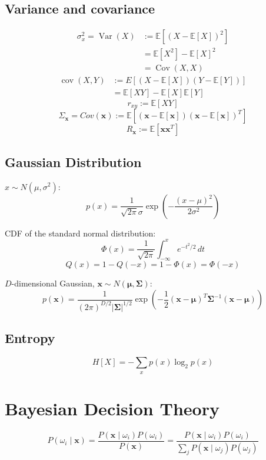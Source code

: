 \documentclass{article}
\begin{document}
\begin{multicols}{2}
\subsection{Variance and covariance}
\[\begin{split}
	\sigma_x^2 = \operatorname{Var}(X) &:= \mathbb{E}[(X - \mathbb{E}[X])^2] \\
	&= \mathbb{E}[X^2] - \mathbb{E}[X]^2 \\
	&= \operatorname{Cov}(X, X)
\end{split}\]
\[\begin{split}
	\operatorname{cov}(X, Y) &:= E{\left[(X - \mathbb{E}[X])(Y - \mathbb{E}[Y])\right]} \\
	&= \mathbb{E}[X Y] - \mathbb{E}[X] \mathbb{E}[Y]
\end{split}\]
\[r_{xy} := \mathbb{E}[X Y]\]
\[\Sigma_{\symbf{x}} = Cov(\symbf{x}) := \mathbb{E}\left[(\symbf{x} - \mathbb{E}[\symbf{x}])(\symbf{x} - \mathbb{E}[\symbf{x}])^T\right]\]
\[R_{\symbf{x}} := \mathbb{E}[\symbf{x} \symbf{x}^T]\]

\subsection{Gaussian Distribution}
$x \sim N(\mu, \sigma^2)$:
\[p(x) = \frac{1}{\sqrt{2 \pi} \sigma} \exp\left(-\frac{(x-\mu)^2}{2\sigma^2}\right)\]

CDF of the standard normal distribution:
\[\Phi(x) = \frac{1}{\sqrt{2\pi}} \int_{-\infty}^x e^{-t^2/2} \, dt\]
\[Q(x) = 1 - Q(-x) = 1 - \Phi(x) = \Phi(-x)\]

$D$-dimensional Gaussian, $\symbf{x} \sim N(\symbf{\mu}, \symbf{\Sigma})$:
\[p(\symbf{x}) = \frac{1}{(2 \pi)^{D/2} |\symbf{\Sigma}|^{1/2}} \exp\left(-\frac{1}{2}(\symbf{x}-\symbf{\mu})^T \symbf{\Sigma}^{-1} (\symbf{x}-\symbf{\mu}) \right)\]

\subsection{Entropy}
\[H[X] = - \sum_x p(x) \log_2 p(x)\]


\section{Bayesian Decision Theory}

\[P(\omega_i \mid \symbf{x}) = \frac{P(\symbf{x} \mid \omega_i) P(\omega_i)}{P(\symbf{x})} = \frac{P(\symbf{x} \mid \omega_i) P(\omega_i)}{\sum\limits_j P(\symbf{x} \mid \omega_j) P(\omega_j)}\]


\end{multicols}
\end{document}

